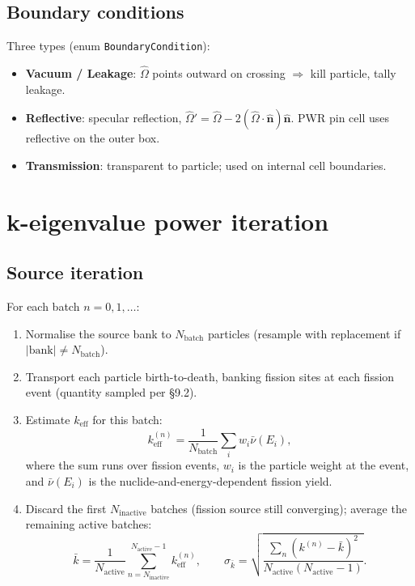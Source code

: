 \documentclass[11pt,a4paper]{article}
\begin{document}
\subsection{Boundary conditions}

Three types (enum \texttt{BoundaryCondition}):
\begin{itemize}
  \item \textbf{Vacuum / Leakage}: $\hat{\Omega}$ points outward on
  crossing $\Rightarrow$ kill particle, tally leakage.
  \item \textbf{Reflective}: specular reflection,
  $\hat{\Omega}' = \hat{\Omega} - 2(\hat{\Omega}\cdot\hat{\mathbf{n}})
  \hat{\mathbf{n}}$. PWR pin cell uses reflective on the
  outer box.
  \item \textbf{Transmission}: transparent to particle; used on
  internal cell boundaries.
\end{itemize}

\section{k-eigenvalue power iteration}

\subsection{Source iteration}

For each batch $n = 0, 1, \ldots$:
\begin{enumerate}
  \item Normalise the source bank to $N_\text{batch}$ particles
  (resample with replacement if $|\text{bank}| \neq N_\text{batch}$).
  \item Transport each particle birth-to-death, banking fission
  sites at each fission event (quantity sampled per
  \S9.2).
  \item Estimate $k_\text{eff}$ for this batch:
  \begin{equation}
  k_\text{eff}^{(n)} = \frac{1}{N_\text{batch}}
  \sum_i w_i \bar\nu(E_i),
  \end{equation}
  where the sum runs over fission events, $w_i$ is the
  particle weight at the event, and $\bar\nu(E_i)$ is the
  nuclide-and-energy-dependent fission yield.
  \item Discard the first $N_\text{inactive}$ batches
  (fission source still converging); average the remaining
  active batches:
  \begin{equation}
  \bar k = \frac{1}{N_\text{active}}
  \sum_{n = N_\text{inactive}}^{N_\text{active} - 1} k_\text{eff}^{(n)},
  \qquad
  \sigma_{\bar k} = \sqrt{\frac{\sum_n (k^{(n)} - \bar k)^2}
  {N_\text{active}(N_\text{active}-1)}}.
  \end{equation}
\end{enumerate}
\end{document}
